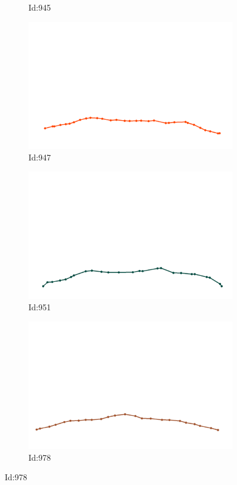 \documentclass[12pt,twoside]{report}
\begin{document}
\begin{figure}
\begin{subfigure}[b]{0.20\textwidth}
\caption{Id:945}
\end{subfigure}
\begin{subfigure}[b]{0.20\textwidth}
\centering
\includegraphics[width=\textwidth]{../trajectories/947.png}
\caption{Id:947}
\end{subfigure}
\begin{subfigure}[b]{0.20\textwidth}
\centering
\includegraphics[width=\textwidth]{../trajectories/951.png}
\caption{Id:951}
\end{subfigure}
\begin{subfigure}[b]{0.20\textwidth}
\centering
\includegraphics[width=\textwidth]{../trajectories/978.png}
\caption{Id:978}
\end{subfigure}
\end{figure}
\end{document}
